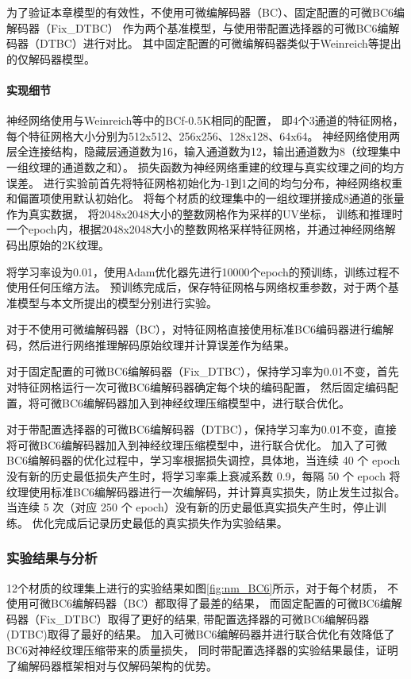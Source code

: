 为了验证本章模型的有效性，不使用可微编解码器（BC）、固定配置的可微BC6编解码器（Fix\_DTBC）
作为两个基准模型，与使用带配置选择器的可微BC6编解码器（DTBC）进行对比。
其中固定配置的可微编解码器类似于Weinreich等\cite{weinreich2024real}提出的仅解码器模型。

\paragraph{实现细节}

神经网络使用与Weinreich等\cite{weinreich2024real}中的BCf-0.5K相同的配置，
即4个3通道的特征网格，每个特征网格大小分别为512x512、256x256、128x128、64x64。
神经网络使用两层全连接结构，隐藏层通道数为16，输入通道数为12，输出通道数为8（纹理集中一组纹理的通道数之和）。
损失函数为神经网络重建的纹理与真实纹理之间的均方误差。
进行实验前首先将特征网格初始化为-1到1之间的均匀分布，神经网络权重和偏置项使用默认初始化。
将每个材质的纹理集中的一组纹理拼接成8通道的张量作为真实数据，
将2048x2048大小的整数网格作为采样的UV坐标，
训练和推理时一个epoch内，根据2048x2048大小的整数网格采样特征网格，并通过神经网络解码出原始的2K纹理。

将学习率设为0.01，使用Adam优化器先进行10000个epoch的预训练，训练过程不使用任何压缩方法。
预训练完成后，保存特征网格与网络权重参数，对于两个基准模型与本文所提出的模型分别进行实验。

对于不使用可微编解码器（BC），对特征网格直接使用标准BC6编码器进行编解码，然后进行网络推理解码原始纹理并计算误差作为结果。

对于固定配置的可微BC6编解码器（Fix\_DTBC），保持学习率为0.01不变，首先对特征网格运行一次可微BC6编解码器确定每个块的编码配置，
然后固定编码配置，将可微BC6编解码器加入到神经纹理压缩模型中，进行联合优化。

对于带配置选择器的可微BC6编解码器（DTBC），保持学习率为0.01不变，直接将可微BC6编解码器加入到神经纹理压缩模型中，进行联合优化。
加入了可微BC6编解码器的优化过程中，学习率根据损失调控，具体地，当连续 40 个 epoch 没有新的历史最低损失产生时，将学习率乘上衰减系数 0.9，每隔 50 个 epoch 将纹理使用标准BC6编解码器进行一次编解码，并计算真实损失，防止发生过拟合。当连续 5 次（对应 250 个 epoch）没有新的历史最低真实损失产生时，停止训练。
优化完成后记录历史最低的真实损失作为实验结果。

\subsubsection{实验结果与分析}

12个材质的纹理集上进行的实验结果如图\ref{fig:nm_BC6}所示，对于每个材质，
不使用可微BC6编解码器（BC）都取得了最差的结果，
而固定配置的可微BC6编解码器（Fix\_DTBC）取得了更好的结果,
带配置选择器的可微BC6编解码器(DTBC)取得了最好的结果。
加入可微BC6编解码器并进行联合优化有效降低了BC6对神经纹理压缩带来的质量损失，
同时带配置选择器的实验结果最佳，证明了编解码器框架相对与仅解码架构的优势。


